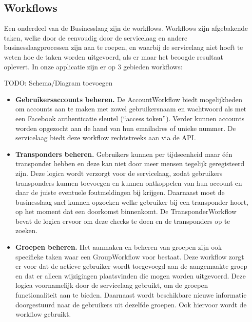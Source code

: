 \subsection{Workflows}

Een onderdeel van de Businesslaag zijn de workflows. Workflows zijn afgebakende taken, 
welke door de eenvoudig door de servicelaag en andere businesslaagprocessen zijn aan te roepen, 
en waarbij de servicelaag niet hoeft te weten hoe de taken worden uitgevoerd, 
als er maar het beoogde resultaat oplevert. In onze applicatie zijn er op 3 gebieden workflows:

{\par \bigskip \par \color{red} TODO: Schema/Diagram toevoegen \par \bigskip \par }

\begin{itemize}
	\item{\textbf{Gebruikersaccounts beheren.}} De AccountWorkflow biedt mogelijkheden om accounts aan te maken met zowel gebruikersnaam en wachtwoord als met een Facebook authenticatie sleutel (``access token''). Verder kunnen accounts worden opgezocht aan de hand van hun emailadres of unieke nummer. De servicelaag biedt deze workflow rechtstreeks aan via de API.

	\item{\textbf{Transponders beheren.}} Gebruikers kunnen per tijdseenheid maar één transponder hebben en deze kan niet door meer mensen tegelijk geregisteerd zijn. Deze logica wordt verzorgt voor de servicelaag, zodat gebruikers transponders kunnen toevoegen en kunnen ontkoppelen van hun account en daar de juiste eventuele foutmeldingen bij krijgen. Daarnaast moet de businesslaag snel kunnen opzoeken welke gebruiker bij een transponder hoort, op het moment dat een doorkomst binnenkomt. De TransponderWorkflow bevat de logica ervoor om deze checks te doen en de transponders op te zoeken.

	\item{\textbf{Groepen beheren.}} Het aanmaken en beheren van groepen zijn ook specifieke taken waar een GroupWorkflow voor bestaat. Deze workflow zorgt er voor dat de actieve gebruiker wordt toegevoegd aan de aangemaakte groep en dat er alleen wijzigingen plaatsvinden die mogen worden uitgevoerd. Deze logica voornamelijk door de servicelaag gebruikt, om de groepen functionaliteit aan te bieden. Daarnaast wordt beschikbare nieuwe informatie doorgestuurd naar de gebruikers uit dezelfde groepen. Ook hiervoor wordt de workflow gebruikt.

\end{itemize}